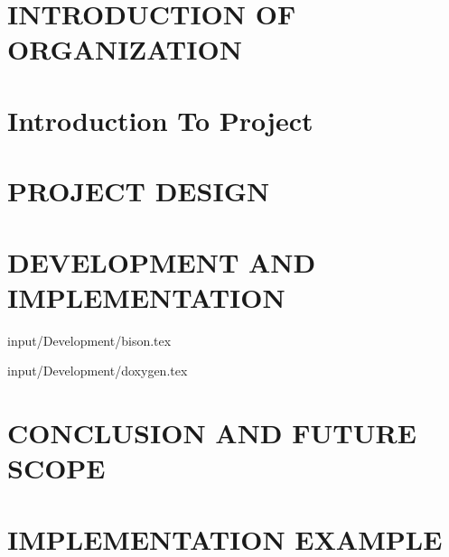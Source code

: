 \documentclass[12pt,includeheadfoot,a4paper]{report}
\begin{document}


\thispagestyle{empty} 
\pagetitle
\newpage
{}
\cfoot{\thepage}



\newpage


\newpage
\tableofcontents
\newpage
\listoffigures
\newpage
\listoftables
\newpage


\cfoot{\thepage}

\newpage
\chapter{INTRODUCTION OF ORGANIZATION}

\newpage


\chapter{Introduction To Project}








\chapter{PROJECT DESIGN}








\newpage
\chapter{DEVELOPMENT AND IMPLEMENTATION}


 {input/Development/bison.tex}


%
%
%

 {input/Development/doxygen.tex}




\chapter{CONCLUSION AND FUTURE SCOPE}







\appendix
\chapter{IMPLEMENTATION EXAMPLE}

\end{document}
